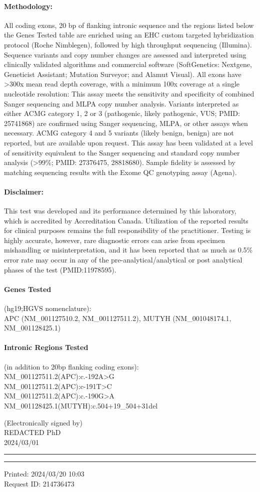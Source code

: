 \documentclass[9pt]{extarticle}
\begin{document}
\paragraph{Methodology:} All coding exons, 20 bp of flanking intronic sequence and the regions listed below the Genes Tested table are enriched using an EHC custom targeted hybridization protocol (Roche Nimblegen), followed by high throughput sequencing (Illumina). Sequence variants and copy number changes are assessed and interpreted using clinically validated algorithms and commercial software (SoftGenetics: Nextgene, Geneticist Assistant; Mutation Surveyor; and Alamut Visual). All exons have >300x mean read depth coverage, with a minimum 100x coverage at a single nucleotide resolution: This assay meets the sensitivity and specificity of combined Sanger sequencing and MLPA copy number analysis. Variants interpreted as either ACMG category 1, 2 or 3 (pathogenic, likely pathogenic, VUS; PMID: 25741868) are confirmed using Sanger sequencing, MLPA, or other assays when necessary. ACMG category 4 and 5 variants (likely benign, benign) are not reported, but are available upon request. This assay has been validated at a level of sensitivity equivalent to the Sanger sequencing and standard copy number analysis (>99\%; PMID: 27376475, 28818680). Sample fidelity is assessed by matching sequencing results with the Exome QC genotyping assay (Agena).

\paragraph{Disclaimer:} This test was developed and its performance determined by this laboratory, which is accredited by Accreditation Canada. Utilization of the reported results for clinical purposes remains the full responsibility of the practitioner. Testing is highly accurate, however, rare diagnostic errors can arise from specimen mishandling or misinterpretation, and it has been reported that as much as 0.5\% error rate may occur in any of the pre-analytical/analytical or post analytical phases of the test (PMID:11978595).

\paragraph{Genes Tested} (hg19;HGVS nomenclature): \\
APC (NM\_001127510.2, NM\_001127511.2), MUTYH (NM\_001048174.1, NM\_001128425.1)

\paragraph{Intronic Regions Tested} (in addition to 20bp flanking coding exons): \\
NM\_001127511.2(APC):c.-192A>G \\
NM\_001127511.2(APC):c-191T>C \\
NM\_001127511.2(APC):c.-190G>A \\
NM\_001128425.1(MUTYH):c.504+19\_504+31del
\vspace{1em}

(Electronically signed by) \\
REDACTED PhD \\
2024/03/01

\vspace{1em}
\hrule
\vspace{1pt}
\hrule
\vspace{1em}

Printed: 2024/03/20 10:03\\
Request ID: 214736473
\end{document}
